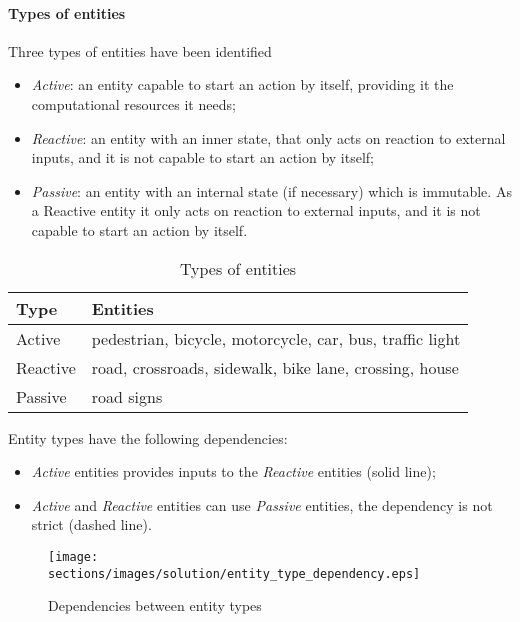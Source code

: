 \paragraph{Types of entities}
Three types of entities have been identified
\begin{itemize}
  \item \textit{Active}: an entity capable to start an action by itself, 
  providing it the computational resources it needs;
  \item \textit{Reactive}: an entity with an inner state, that only acts on 
reaction to external inputs, and it is not capable to start an action by itself;
  \item \textit{Passive}: an entity with an internal state (if necessary) which 
is immutable. As a Reactive entity it only acts on reaction to external inputs, 
and it is not capable to start an action by itself.
\end{itemize}
\begin{table}[H]
\centering
\begin{tabular}{|l|l|}
\hline
\rowcolor{BlueGreen}
Type     & Entities                                 \\ \hline
Active   & pedestrian, bicycle, motorcycle, car, bus, traffic light \\ \hline
Reactive & road, crossroads, sidewalk, bike lane, crossing, house \\ \hline
Passive  & road signs                               \\ \hline
\end{tabular}
\caption{Types of entities}
\label{tab:entity_type}
\end{table}
Entity types have the following dependencies:
\begin{itemize}
  \item \textit{Active} entities provides inputs to the \textit{Reactive} 
entities (solid line);
  \item \textit{Active} and \textit{Reactive} entities can use \textit{Passive} 
entities, the dependency is not strict (dashed line).
\end{itemize}
\begin{figure}[H]
  \centering
  \texttt{[image: sections/images/solution/entity\_type\_dependency.eps]}
  \caption{Dependencies between entity types}
  \label{fig:sd-entity-types-deps}
\end{figure}
